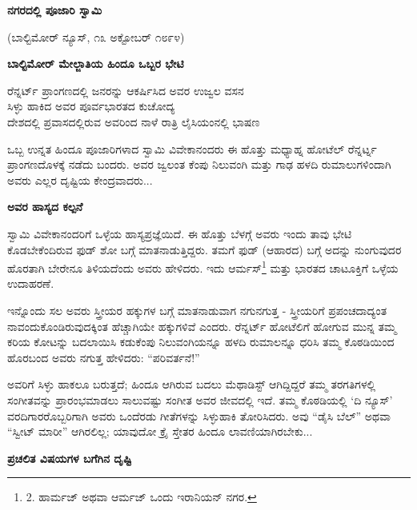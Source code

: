 \begin{center}
\textbf{ನಗರದಲ್ಲಿ ಪೂಜಾರಿ ಸ್ವಾಮಿ}
\end{center}

\begin{center}
(ಬಾಲ್ಟಿಮೋರ್ ನ್ಯೂಸ್, ೧೩ ಅಕ್ಟೋಬರ್ ೧೮೯೪)
\end{center}

\begin{center}
\textbf{ಬಾಲ್ಟಿಮೋರ್ ಮೇಲ್ಜಾತಿಯ ಹಿಂದೂ ಒಬ್ಬರ ಭೇಟಿ}
\end{center}

\begin{center}
ರೆನ್ನರ್ಟ್ ಪ್ರಾಂಗಣದಲ್ಲಿ ಜನರನ್ನು ಆಕರ್ಷಿಸಿದ ಅವರ ಉಜ್ವಲ ವಸನ\\ಸಿಳ್ಳು ಹಾಕಿದ ಅವರ ಪೂರ್ವಭಾರತದ ಕುಚೋದ್ಯ\\ದೇಶದಲ್ಲಿ ಪ್ರವಾಸದಲ್ಲಿರುವ ಅವರಿಂದ ನಾಳೆ ರಾತ್ರಿ ಲೈಸಿಯಂನಲ್ಲಿ ಭಾಷಣ
\end{center}

ಒಬ್ಬ ಉನ್ನತ ಹಿಂದೂ ಪೂಜಾರಿಗಳಾದ ಸ್ವಾಮಿ ವಿವೇಕಾನಂದರು ಈ ಹೊತ್ತು ಮಧ್ಯಾಹ್ನ ಹೋಟೆಲ್ ರೆನ್ನರ್ಟ್ನ ಪ್ರಾಂಗಣದೊಳಕ್ಕೆ ನಡೆದು ಬಂದರು. ಅವರ ಜ್ವಲಂತ ಕೆಂಪು ನಿಲುವಂಗಿ ಮತ್ತು ಗಾಢ ಹಳದಿ ರುಮಾಲುಗಳಿಂದಾಗಿ ಅವರು ಎಲ್ಲರ ದೃಷ್ಟಿಯ ಕೇಂದ್ರವಾದರು...

\begin{center}
\textbf{ಅವರ ಹಾಸ್ಯದ ಕಲ್ಪನೆ}
\end{center}

ಸ್ವಾಮಿ ವಿವೇಕಾನಂದರಿಗೆ ಒಳ್ಳೆಯ ಹಾಸ್ಯಪ್ರಜ್ಞೆಯಿದೆ. ಈ ಹೊತ್ತು ಬೆಳಗ್ಗೆ ಅವರು ಇಂದು ತಾವು ಭೇಟಿ ಕೊಡಬೇಕೆಂದಿರುವ ಫುಡ್ ಶೋ ಬಗ್ಗೆ ಮಾತನಾಡುತ್ತಿದ್ದರು. ತಮಗೆ ಫುಡ್ (ಆಹಾರದ) ಬಗ್ಗೆ ಅದನ್ನು ನುಂಗುವುದರ ಹೊರತಾಗಿ ಬೇರೇನೂ ತಿಳಿಯದೆಂದು ಅವರು ಹೇಳಿದರು. ಇದು ಆರ್ಮಸ್\footnote{2. ಹಾರ್ಮಜ್ ಅಥವಾ ಆರ್ಮಜ್ ಒಂದು ಇರಾನಿಯನ್ ನಗರ.} ಮತ್ತು ಭಾರತದ ಚಾಟೂಕ್ತಿಗೆ ಒಳ್ಳೆಯ ಉದಾಹರಣೆ.

ಇನ್ನೊಂದು ಸಲ ಅವರು ಸ್ತ್ರೀಯರ ಹಕ್ಕುಗಳ ಬಗ್ಗೆ ಮಾತನಾಡುವಾಗ ನಗುನಗುತ್ತ - ಸ್ತ್ರೀಯರಿಗೆ ಪ್ರಪಂಚದಾದ್ಯಂತ ನಾವಂದುಕೊಂಡಿರುವುದಕ್ಕಿಂತ ಹೆಚ್ಚಾಗಿಯೇ ಹಕ್ಕುಗಳಿವೆ ಎಂದರು. ರೆನ್ನರ್ಟ್ ಹೋಟೆಲಿಗೆ ಹೋಗುವ ಮುನ್ನ ತಮ್ಮ ಕರಿಯ ಕೋಟನ್ನು ಬದಲಾಯಿಸಿ ಕಡುಕೆಂಪು ನಿಲುವಂಗಿಯನ್ನೂ ಹಳದಿ ರುಮಾಲನ್ನೂ ಧರಿಸಿ ತಮ್ಮ ಕೊಠಡಿಯಿಂದ ಹೊರಬಂದ ಅವರು ನಗುತ್ತ ಹೇಳಿದರು: “ಪರಿವರ್ತನೆ!”

ಅವರಿಗೆ ಸಿಳ್ಳು ಹಾಕಲೂ ಬರುತ್ತದೆ; ಹಿಂದೂ ಆಗಿರುವ ಬದಲು ಮೆಥಾಡಿಸ್ಟ್ ಆಗಿದ್ದಿದ್ದರೆ ತಮ್ಮ ತರಗತಿಗಳಲ್ಲಿ ಸಂಗೀತವನ್ನು ಪ್ರಾರಂಭಮಾಡಲು ಸಾಲುವಷ್ಟು ಸಂಗೀತ ಅವರ ಜೀವದಲ್ಲಿ ಇದೆ. ತಮ್ಮ ಕೊಠಡಿಯಲ್ಲಿ ‘ದಿ ನ್ಯೂಸ್’ ವರದಿಗಾರರೊಬ್ಬರಿಗಾಗಿ ಅವರು ಒಂದೆರಡು ಗೀತೆಗಳನ್ನು ಸಿಳ್ಳುಹಾಕಿ ತೋರಿಸಿದರು. ಅವು “ಡೈಸಿ ಬೆಲ್” ಅಥವಾ “ಸ್ವೀಟ್ ಮಾರೀ” ಆಗಿರಲಿಲ್ಲ; ಯಾವುದೋ ಕ್ರೈ ಸ್ತೇತರ ಹಿಂದೂ ಲಾವಣಿಯಾಗಿರಬೇಕು...

\begin{center}
\textbf{ಪ್ರಚಲಿತ ವಿಷಯಗಳ ಬಗೆಗಿನ ದೃಷ್ಟಿ}
\end{center}

